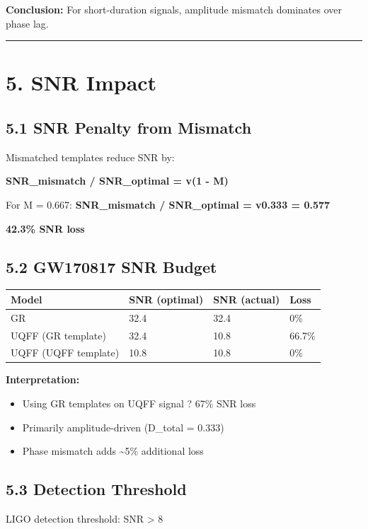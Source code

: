 \documentclass[11pt]{article}
\begin{document}
\textbf{Conclusion:} For short-duration signals, amplitude mismatch dominates over phase lag.

\noindent\rule{\textwidth}{0.4pt}

\section*{5. SNR Impact}

\subsection*{5.1 SNR Penalty from Mismatch}

Mismatched templates reduce SNR by:

\textbf{SNR\_mismatch / SNR\_optimal = v(1 - M)}

For M = 0.667: \textbf{SNR\_mismatch / SNR\_optimal = v0.333 = 0.577}

\textbf{42.3\% SNR loss}

\subsection*{5.2 GW170817 SNR Budget}

\begin{center}
\begin{longtable}{llll}
\toprule
Model & SNR (optimal) & SNR (actual) & Loss \tabularnewline
\midrule
\endhead
GR & 32.4 & 32.4 & 0\% \tabularnewline
UQFF (GR template) & 32.4 & 10.8 & 66.7\% \tabularnewline
UQFF (UQFF template) & 10.8 & 10.8 & 0\% \tabularnewline
\bottomrule
\end{longtable}
\end{center}

\textbf{Interpretation:}

\begin{itemize}
  \item Using GR templates on UQFF signal ? 67\% SNR loss
  \item Primarily amplitude-driven (D\_total = 0.333)
  \item Phase mismatch adds \textasciitilde{}5\% additional loss
\end{itemize}

\subsection*{5.3 Detection Threshold}

LIGO detection threshold: SNR > 8
\end{document}
